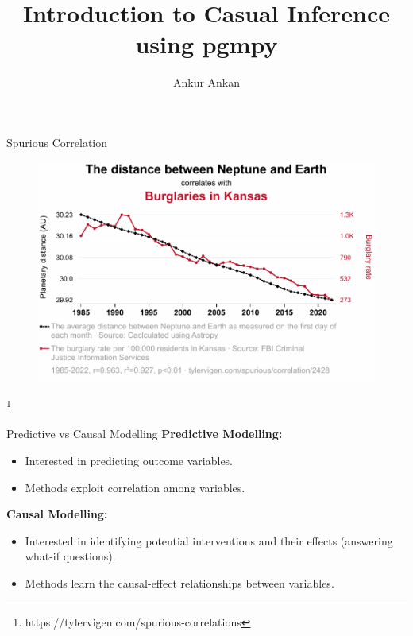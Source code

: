 \documentclass[aspectratio=169]{beamer}
\title[Causal Inference using pgmpy]{Introduction to Casual Inference using pgmpy}
\author{Ankur Ankan}
\institute[]{Postdoctoral Researcher \\ Radboud University, The Netherlands}
\date{}
\newcommand\blfootnote[1]{
    \begingroup
    \renewcommand\thefootnote{}\footnote{#1}
    \addtocounter{footnote}{-1}
    \endgroup
}
\begin{document}
\begin{frame}
	\maketitle
\end{frame}

\begin{frame}{Spurious Correlation}
	\begin{figure}
		\center
		\includegraphics[scale=0.63]{imgs/spurious1.pdf}
	\end{figure}
	\blfootnote{https://tylervigen.com/spurious-correlations}
\end{frame}

\begin{frame}{Predictive vs Causal Modelling}
	\textbf{Predictive Modelling:}
		\begin{itemize}
			\item Interested in predicting outcome variables.
			\item Methods exploit correlation among variables.
		\end{itemize}
	\vspace{2em}
	\textbf{Causal Modelling:}
		\begin{itemize}
			\item Interested in identifying potential interventions and their effects (answering what-if questions).
			\item Methods learn the causal-effect relationships between variables.
		\end{itemize}
\end{frame}


\end{document}
